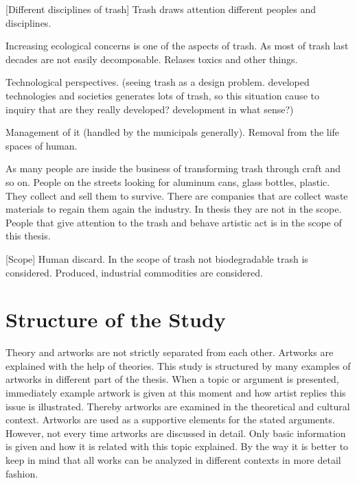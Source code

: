 %
%
[Different disciplines of trash] Trash draws attention different peoples and disciplines. 

 

Increasing ecological concerns is one of the aspects of trash. As most of trash last decades are not easily decomposable. Relases toxics and other things.

Technological perspectives. (seeing trash as a design problem. developed technologies and societies generates lots of trash, so this situation cause to inquiry that are they really developed? development in what sense?)

Management of it (handled by the municipals generally). Removal from the life spaces of human.

As many people are inside the business of transforming trash through craft and so on. People on the streets looking for aluminum cans, glass bottles, plastic. They collect and sell them to survive. There are companies that are collect waste materials to regain them again the industry. In thesis they are not in the scope. People that give attention to the trash and behave artistic act is in the scope of this thesis.





%
%
[Scope] Human discard. In the scope of trash not biodegradable trash is considered. Produced, industrial commodities are considered.





%
\section{Structure of the Study}
Theory and artworks are not strictly separated from each other. Artworks are explained with the help of theories. This study is structured by many examples of artworks in different part of the thesis. When a topic or argument is presented, immediately example artwork is given at this moment and how artist replies this issue is illustrated. Thereby artworks are examined in the theoretical and cultural context. Artworks are used as a supportive elements for the stated arguments.  However, not every time artworks are discussed in detail. Only basic information is given and how it is related with this topic explained. By the way it is better to keep in mind that all works can be analyzed in different contexts in more detail fashion.

